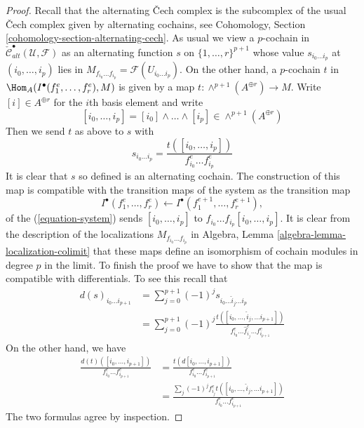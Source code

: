 \begin{proof}
Recall that the alternating {\v C}ech complex is the subcomplex
of the usual {\v C}ech complex given by alternating cochains, see
Cohomology, Section \ref{cohomology-section-alternating-cech}.
As usual we view a $p$-cochain in
$\check{\mathcal{C}}_{alt}^\bullet(\mathcal{U}, \mathcal{F})$
as an alternating function $s$ on $\{1, \ldots, r\}^{p + 1}$
whose value $s_{i_0\ldots i_p}$ at $(i_0, \ldots, i_p)$ lies in
$M_{f_{i_0}\ldots f_{i_p}} = \mathcal{F}(U_{i_0\ldots i_p})$.
On the other hand, a $p$-cochain $t$ in
$\Hom_A(I^\bullet(f_1^e, \ldots, f_r^e), M)$
is given by a map $t : \wedge^{p + 1}(A^{\oplus r}) \to M$.
Write $[i] \in A^{\oplus r}$ for the $i$th basis element and
write
$$
[i_0, \ldots, i_p] = [i_0] \wedge \ldots \wedge [i_p]
\in \wedge^{p + 1}(A^{\oplus r})
$$
Then we send $t$ as above to $s$ with
$$
s_{i_0\ldots i_p} = \frac{t([i_0, \ldots, i_p])}{f_{i_0}^e\ldots f_{i_p}^e}
$$
It is clear that $s$ so defined is an alternating cochain.
The construction of this map is compatible with the transition maps
of the system as the transition map
$$
I^\bullet(f_1^e, \ldots, f_r^e) \leftarrow
I^\bullet(f_1^{e + 1}, \ldots, f_r^{e + 1}),
$$
of the (\ref{equation-system}) sends $[i_0, \ldots, i_p]$
to $f_{i_0}\ldots f_{i_p}[i_0, \ldots, i_p]$.
It is clear from the description of the localizations
$M_{f_{i_0}\ldots f_{i_p}}$ in
Algebra, Lemma \ref{algebra-lemma-localization-colimit}
that these maps define an isomorphism of cochain modules in degree $p$
in the limit. To finish the proof we have to show that the map
is compatible with differentials. To see this recall that
\begin{align*}
d(s)_{i_0\ldots i_{p + 1}}
& =
\sum\nolimits_{j = 0}^{p + 1} (-1)^j
s_{i_0\ldots \hat i_j \ldots i_p} \\
& = 
\sum\nolimits_{j = 0}^{p + 1} (-1)^j
\frac{t([i_0, \ldots, \hat i_j, \ldots i_{p + 1}])}
{f_{i_0}^e\ldots \hat f_{i_j}^e \ldots f_{i_{p + 1}}^e}
\end{align*}
On the other hand, we have
\begin{align*}
\frac{d(t)([i_0, \ldots, i_{p + 1}])}{f_{i_0}^e\ldots f_{i_{p + 1}}^e}
& =
\frac{t(d[i_0, \ldots, i_{p + 1}])}{f_{i_0}^e\ldots f_{i_{p + 1}}^e} \\
& =
\frac{\sum_j (-1)^j f_{i_j}^e t([i_0, \ldots, \hat i_j, \ldots i_{p + 1}])}
{f_{i_0}^e \ldots f_{i_{p + 1}}^e}
\end{align*}
The two formulas agree by inspection.
\end{proof}


